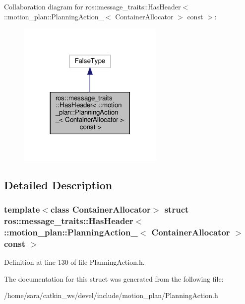 Collaboration diagram for ros\+:\+:message\+\_\+traits\+:\+:Has\+Header$<$ \+:\+:motion\+\_\+plan\+:\+:Planning\+Action\+\_\+$<$ Container\+Allocator $>$ const $>$\+:
\nopagebreak
\begin{figure}[H]
\begin{center}
\leavevmode
\includegraphics[width=200pt]{structros_1_1message__traits_1_1HasHeader_3_01_1_1motion__plan_1_1PlanningAction___3_01Container99f75a4a6392b1b4f9489fd0b88b0778}
\end{center}
\end{figure}


\subsection{Detailed Description}
\subsubsection*{template$<$class Container\+Allocator$>$\newline
struct ros\+::message\+\_\+traits\+::\+Has\+Header$<$ \+::motion\+\_\+plan\+::\+Planning\+Action\+\_\+$<$ Container\+Allocator $>$ const $>$}



Definition at line 130 of file Planning\+Action.\+h.



The documentation for this struct was generated from the following file\+:\begin{DoxyCompactItemize}
\item 
/home/sara/catkin\+\_\+ws/devel/include/motion\+\_\+plan/Planning\+Action.\+h\end{DoxyCompactItemize}
